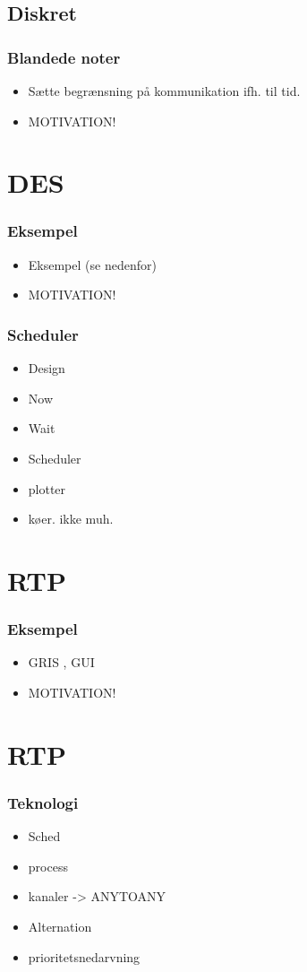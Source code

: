 \documentclass[12pt]{beamer}
\begin{document}
\subsection{Diskret}
\begin{frame}
  \frametitle{Blandede noter}
  \begin{itemize}
    
    \item Sætte begrænsning på kommunikation ifh. til tid.
    \item MOTIVATION!
  \end{itemize}
\end{frame}

\section{DES}
\begin{frame}
  \frametitle{Eksempel}
  \begin{itemize}   
    \item Eksempel (se nedenfor)
	
    \item MOTIVATION!
  \end{itemize}
\end{frame}

\begin{frame}
  \frametitle{Scheduler}
  \begin{itemize}   
\item Design	
    \item Now
\item Wait
\item Scheduler
\item plotter
\item køer. ikke muh.
  \end{itemize}
\end{frame}


\section{RTP}
\begin{frame}
  \frametitle{Eksempel}
  \begin{itemize}   
    \item GRIS , GUI	
    \item MOTIVATION!
  \end{itemize}
\end{frame}

\section{RTP}
\begin{frame}
  \frametitle{Teknologi}
  \begin{itemize}   
    \item Sched	
    \item process
	\item kanaler -> ANYTOANY
	\item Alternation
	\item prioritetsnedarvning
  \end{itemize}
\end{frame}
\end{document}
